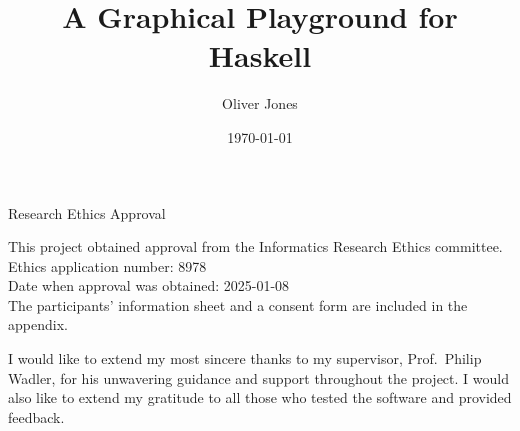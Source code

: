 \documentclass[../main.tex]{subfiles}
\begin{document}
\begin{preliminary}

    \title{A Graphical Playground for Haskell}
    \author{Oliver Jones}
    \date{\today}

    \abstract{
    }

    \maketitle

    \newenvironment{ethics}{
        \begin{frontenv}{Research Ethics Approval}{\LARGE}} {
        \end{frontenv}
        \newpage}

    \begin{ethics}

        This project obtained approval from the Informatics Research Ethics committee.
        \\
        Ethics application number: 8978
        \\
        Date when approval was obtained: 2025-01-08
        \\

        The participants' information sheet and a consent form are included in the
            appendix.
        \\


        \standarddeclaration
    \end{ethics}

    \begin{acknowledgements}
        I would like to extend my most sincere thanks to my supervisor, Prof.~Philip
            Wadler, for his unwavering guidance and support throughout the project.
        I would also like to extend my gratitude to all those who tested the software
            and provided feedback.
    \end{acknowledgements}

    \tableofcontents
\end{preliminary}
\end{document}
